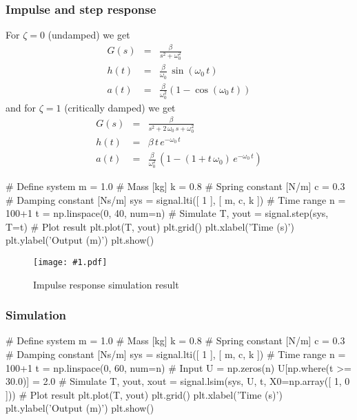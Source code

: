 \documentclass[a4paper,12pt]{article}
\newcommand{\Fig}[3]{%
	\begin{figure}[htb]%
	\begin{center}%
	\texttt{[image: \#1.pdf]}%
	\end{center}%
	\caption{#3\label{fig:#1}}%
	\end{figure}%
	}
\newcommand*{\CodeLabel}{}
\newcommand*{\CodeCaption}{}
\newenvironment{code}[3]%
	{\renewcommand*{\CodeLabel}{#2}\renewcommand*{\CodeCaption}{#3}\codefloat\hrulefill\minted{#1}}
	{\endminted\caption{\CodeCaption\label{code:\CodeLabel}}\hrulefill\endcodefloat}
\newcommand{\SubSubSection}[2]{\subsubsection{#2}\label{subsubsection:#1}}
\begin{document}
\SubSubSection{pulsestepA}{Impulse and step response}

For $\zeta=0$ (undamped) we get
\begin{eqnarray}
G(s)&=&\frac{\beta}{s^2+\omega_0^2}\\
h(t)&=&\frac{\beta}{\omega_0}\,\sin(\omega_0\,t)\\
a(t)&=&\frac{\beta}{\omega_0^2}\left(1-\cos(\omega_0\,t)\right)
\end{eqnarray}
and for $\zeta=1$ (critically damped) we get
\begin{eqnarray}
G(s)&=&\frac{\beta}{s^2+2\,\omega_0\,s+\omega_0^2}\\
h(t)&=&\beta\,t\,e^{-\omega_0\,t}\\
a(t)&=&\frac{\beta}{\omega_0^2}\,\left(1-\left(1+t\,\omega_0\right)\,e^{-\omega_0\,t}\right)
\end{eqnarray}

\begin{code}{python}{pulseA}{Simulate the impulse response of a system}
# Define system
m = 1.0 # Mass [kg]
k = 0.8 # Spring constant [N/m]
c = 0.3 # Damping constant [Ns/m]
sys = signal.lti([ 1 ], [ m, c, k ])
# Time range
n = 100+1
t = np.linspace(0, 40, num=n)
# Simulate
T, yout = signal.step(sys, T=t)
# Plot result
plt.plot(T, yout)
plt.grid()
plt.xlabel('Time (s)')
plt.ylabel('Output (m)')
plt.show()
\end{code}

\Fig{step}{0.6}{Impulse response simulation result}


\SubSubSection{simuA}{Simulation}

\begin{code}{python}{simuAcode}{Simulate a system}
# Define system
m = 1.0 # Mass [kg]
k = 0.8 # Spring constant [N/m]
c = 0.3 # Damping constant [Ns/m]
sys = signal.lti([ 1 ], [ m, c, k ])
# Time range
n = 100+1
t = np.linspace(0, 60, num=n)
# Input
U = np.zeros(n)
U[np.where(t >= 30.0)] = 2.0
# Simulate
T, yout, xout = signal.lsim(sys, U, t, X0=np.array([ 1, 0 ]))
# Plot result
plt.plot(T, yout)
plt.grid()
plt.xlabel('Time (s)')
plt.ylabel('Output (m)')
plt.show()
\end{code}
\end{document}
